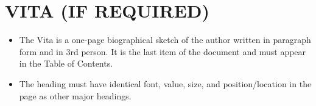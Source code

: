 \chapter*{VITA (IF REQUIRED)}

\begin{itemize}
\item
The Vita is a one-page biographical sketch of the author written in paragraph
form and in 3rd person. It is the last item of the document and must appear in the
Table of Contents.
\item
The heading must have identical font, value, size, and position/location in the
page as other major headings.
\end{itemize}
